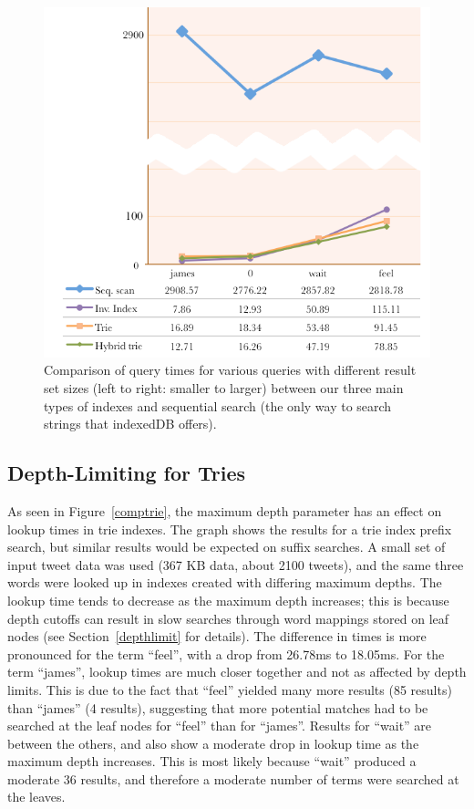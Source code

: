 \documentclass{vldb}
\begin{document}
\begin{figure}
   \includegraphics[scale=.39]{query-times}
  \caption{Comparison of query times for various queries with different result set sizes (left to right: smaller to larger) between our three main types of indexes and sequential search (the only way to search strings that indexedDB offers). }
  \label{querytimes}
\end{figure}

\subsection{Depth-Limiting for Tries}
As seen in Figure~\ref{comptrie}, the maximum depth parameter has an effect on lookup times in trie indexes. The graph shows the results for a trie index prefix search, but similar results would be expected on suffix searches. A small set of input tweet data was used (367 KB data, about 2100 tweets), and the same three words were looked up in indexes created with differing maximum depths. The lookup time tends to decrease as the maximum depth increases; this is because depth cutoffs can result in slow searches through word mappings stored on leaf nodes (see Section~\ref{depthlimit} for details). The difference in times is more pronounced for the term ``feel'', with a drop from 26.78ms to 18.05ms. For the term ``james'', lookup times are much closer together and not as affected by depth limits. This is due to the fact that ``feel'' yielded many more results (85 results) than ``james'' (4 results), suggesting that more potential matches had to be searched at the leaf nodes for ``feel'' than for ``james''. Results for ``wait'' are between the others, and also show a moderate drop in lookup time as the maximum depth increases. This is most likely because ``wait'' produced a moderate 36 results, and therefore a moderate number of terms were searched at the leaves.
\end{document}

